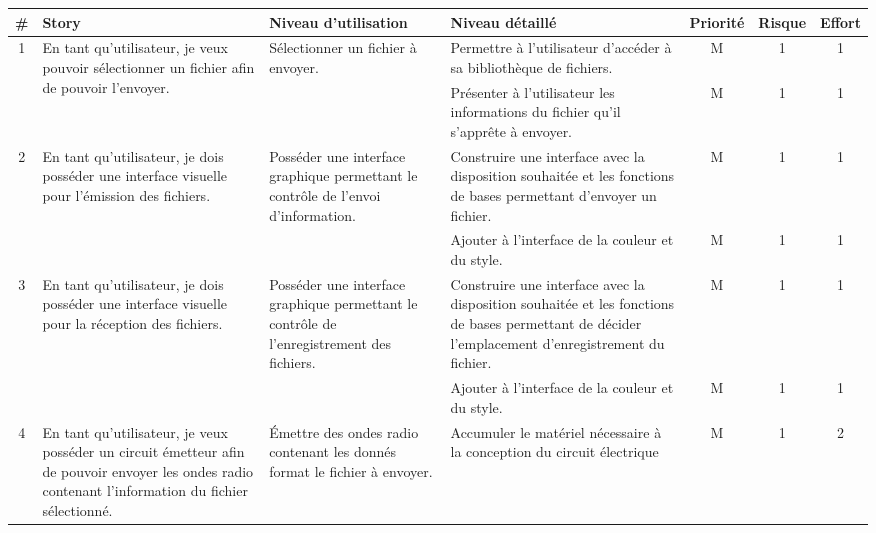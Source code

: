 \begin{table}[ht]
    \centering
    \begin{tabularx}{20 cm}{|c|X|X|X|c|c|c|}
    \hline
    \rowcolor{Gray}
    \# & Story & Niveau d'utilisation & Niveau détaillé & Priorité & Risque & Effort\\
    \hline
          \multirow{2}{*}{1} 
        & \multirow{2}{=}{
          En tant qu'utilisateur, 
          je veux pouvoir sélectionner un fichier
          afin de pouvoir l'envoyer.} 
        & \multirow{2}{=}{Sélectionner un fichier à envoyer.} 
        & Permettre à l'utilisateur d'accéder à sa bibliothèque de fichiers. 
        & M & 1 & 1 \\
    \cline{4-7}
        
        &
        &
        & Présenter à l'utilisateur les informations du fichier qu'il s'apprête à envoyer.
        & M & 1 & 1 \\
    \hline
          \multirow{2}{*}{2}
        & \multirow{2}{=}{En tant qu'utilisateur,
                          je dois posséder une interface visuelle
                          pour l'émission des fichiers.}
        & \multirow{2}{=}{Posséder une interface graphique permettant le contrôle de l'envoi d'information.}
        & Construire une interface avec la disposition souhaitée et les fonctions de bases permettant d'envoyer un fichier. & M & 1 & 1 \\
    \cline{4-7}
        & & & Ajouter à l'interface de la couleur et du style. & M & 1 & 1 \\
        
        \hline
          \multirow{2}{*}{3}
        & \multirow{2}{=}{En tant qu'utilisateur,
                          je dois posséder une interface visuelle
                          pour la réception des fichiers.}
        & \multirow{2}{=}{Posséder une interface graphique permettant le contrôle de l'enregistrement des fichiers.}
        & Construire une interface avec la disposition souhaitée et les fonctions de bases permettant de décider l'emplacement d'enregistrement du fichier. & M & 1 & 1 \\
    \cline{4-7}
        & & & Ajouter à l'interface de la couleur et du style. & M & 1 & 1 \\
        
    \hline
          \multirow{2}{*}{4} 
        & \multirow{2}{=}{
          En tant qu'utilisateur,
          je veux posséder un circuit émetteur afin de pouvoir
          envoyer les ondes radio contenant l'information du 
          fichier sélectionné.} 
        & \multirow{2}{=}{Émettre des ondes radio contenant les donnés format le fichier à envoyer.} 
        & Accumuler le matériel nécessaire à la conception du circuit électrique  
        & M & 1 & 2 \\
    \cline{4-7}
        

\end{tabularx}
\end{table}
